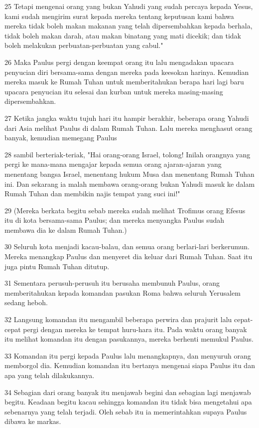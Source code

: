 \par 25 Tetapi mengenai orang yang bukan Yahudi yang sudah percaya kepada Yesus, kami sudah mengirim surat kepada mereka tentang keputusan kami bahwa mereka tidak boleh makan makanan yang telah dipersembahkan kepada berhala, tidak boleh makan darah, atau makan binatang yang mati dicekik; dan tidak boleh melakukan perbuatan-perbuatan yang cabul."
\par 26 Maka Paulus pergi dengan keempat orang itu lalu mengadakan upacara penyucian diri bersama-sama dengan mereka pada keesokan harinya. Kemudian mereka masuk ke Rumah Tuhan untuk memberitahukan berapa hari lagi baru upacara penyucian itu selesai dan kurban untuk mereka masing-masing dipersembahkan.
\par 27 Ketika jangka waktu tujuh hari itu hampir berakhir, beberapa orang Yahudi dari Asia melihat Paulus di dalam Rumah Tuhan. Lalu mereka menghasut orang banyak, kemudian memegang Paulus
\par 28 sambil berteriak-teriak, "Hai orang-orang Israel, tolong! Inilah orangnya yang pergi ke mana-mana mengajar kepada semua orang ajaran-ajaran yang menentang bangsa Israel, menentang hukum Musa dan menentang Rumah Tuhan ini. Dan sekarang ia malah membawa orang-orang bukan Yahudi masuk ke dalam Rumah Tuhan dan membikin najis tempat yang suci ini!"
\par 29 (Mereka berkata begitu sebab mereka sudah melihat Trofimus orang Efesus itu di kota bersama-sama Paulus; dan mereka menyangka Paulus sudah membawa dia ke dalam Rumah Tuhan.)
\par 30 Seluruh kota menjadi kacau-balau, dan semua orang berlari-lari berkerumun. Mereka menangkap Paulus dan menyeret dia keluar dari Rumah Tuhan. Saat itu juga pintu Rumah Tuhan ditutup.
\par 31 Sementara perusuh-perusuh itu berusaha membunuh Paulus, orang memberitahukan kepada komandan pasukan Roma bahwa seluruh Yerusalem sedang heboh.
\par 32 Langsung komandan itu mengambil beberapa perwira dan prajurit lalu cepat-cepat pergi dengan mereka ke tempat huru-hara itu. Pada waktu orang banyak itu melihat komandan itu dengan pasukannya, mereka berhenti memukul Paulus.
\par 33 Komandan itu pergi kepada Paulus lalu menangkapnya, dan menyuruh orang memborgol dia. Kemudian komandan itu bertanya mengenai siapa Paulus itu dan apa yang telah dilakukannya.
\par 34 Sebagian dari orang banyak itu menjawab begini dan sebagian lagi menjawab begitu. Keadaan begitu kacau sehingga komandan itu tidak bisa mengetahui apa sebenarnya yang telah terjadi. Oleh sebab itu ia memerintahkan supaya Paulus dibawa ke markas.
